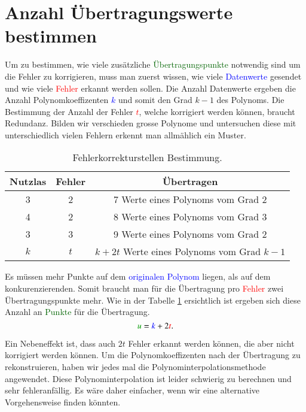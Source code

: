 \section{Anzahl Übertragungswerte bestimmen
\label{reedsolomon:section:Fehlerkorrekturstellen}}
Um zu bestimmen, wie viele zusätzliche \textcolor{darkgreen}{Übertragungspunkte} notwendig sind um die Fehler zu korrigieren,
    muss man zuerst wissen, wie viele \textcolor{blue}{Datenwerte} gesendet und wie viele \textcolor{red}{Fehler} erkannt werden sollen. 
Die Anzahl Datenwerte ergeben die Anzahl Polynomkoeffizenten \textcolor{blue}{$k$} und somit den Grad $k-1$ des Polynoms.
Die Bestimmung der Anzahl der Fehler \textcolor{red}{$t$}, welche korrigiert werden können, braucht Redundanz.
Bilden wir verschieden grosse Polynome und untersuchen diese mit unterschiedlich vielen Fehlern erkennt man allmählich ein Muster.

\begin{table}%
    \centering
    \begin{tabular}{ c c | c} 
        \hline
        Nutzlas & Fehler & Übertragen \\
        \hline 
        3 & 2 & 7 Werte eines Polynoms vom Grad 2 \\ 
        4 & 2 & 8 Werte eines Polynoms vom Grad 3 \\
        3 & 3 & 9 Werte eines Polynoms vom Grad 2 \\ 
        \hline
        $k$ & $t$ & $k+2t$ Werte eines Polynoms vom Grad $k-1$ \\ 
        \hline
    \end{tabular}
    \caption{ Fehlerkorrekturstellen Bestimmung.}
    \label{tab:fehlerkorrekturstellen}
\end{table}
\par 
Es müssen mehr Punkte auf dem \textcolor{blue}{originalen Polynom} liegen, als auf dem konkurenzierenden.
Somit braucht man für die Übertragung pro \textcolor{red}{Fehler} zwei Übertragungspunkte mehr.
Wie in der Tabelle \ref{tab:fehlerkorrekturstellen} ersichtlich ist ergeben sich diese Anzahl an \textcolor{darkgreen}{Punkte} für die Übertragung.
\begin{equation}
    \textcolor{darkgreen}{u}=
    \textcolor{blue}{k}+2\textcolor{red}{t}.
    \label{reedsolomon:equation2}
\end{equation}

Ein Nebeneffekt ist, dass auch $2t$ Fehler erkannt werden können, die aber nicht korrigiert werden können.
Um die Polynomkoeffizenten nach der Übertragung zu rekonstruieren, haben wir jedes mal die Polynominterpolationsmethode angewendet.
Diese Polynominterpolation ist leider schwierig zu berechnen und sehr fehleranfällig.
Es wäre daher einfacher, wenn wir eine alternative Vorgehensweise finden könnten. 


